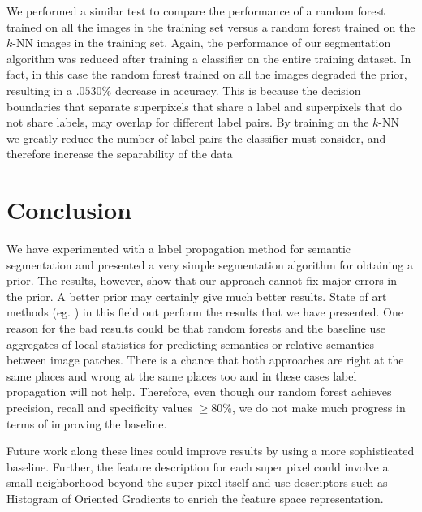 \documentclass{article} %
\begin{document}
We performed a similar test to compare the performance of a random forest trained on all the images in the training set versus a random forest trained on the $k$-NN images in the training set. Again, the performance of our segmentation algorithm was reduced after training a classifier on the entire training dataset. In fact, in this case the random forest trained on all the images degraded the prior, resulting in a $.0530 \%$ decrease in accuracy. This is because the decision boundaries that separate superpixels that share a label and superpixels that do not share labels, may overlap for different label pairs. By training on the $k$-NN we greatly reduce the number of label pairs the classifier must consider, and therefore increase the separability of the data

\section{Conclusion}
\label{sec:Conclusion}
We have experimented with a label propagation method for semantic segmentation and presented a very simple segmentation algorithm for obtaining a prior. The results, however, show that our approach cannot fix major errors in the prior. A better prior may certainly give much better results. State of art methods (eg. \cite{urtasun}) in this field out perform the results that we have presented. One reason for the bad results could be that random forests and the baseline use aggregates of local statistics for predicting semantics or relative semantics between image patches. There is a chance that both approaches are right at the same places and wrong at the same places too and in these cases label propagation will not help. Therefore, even though our random forest achieves precision, recall and specificity values $\ge 80\%$, we do not make much progress in terms of improving the baseline.

Future work along these lines could improve results by using a more sophisticated baseline. Further, the feature description for each super pixel could involve a small neighborhood beyond the super pixel itself and use descriptors such as Histogram of Oriented Gradients \cite{HOG} to enrich the feature space representation.





\end{document}
